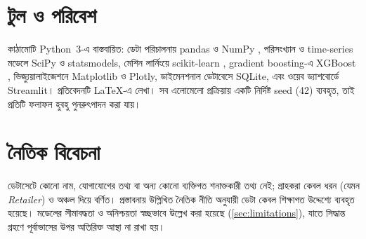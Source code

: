 \section{টুল ও পরিবেশ}
কাঠামোটি Python~3-এ বাস্তবায়িত: ডেটা পরিচালনায় pandas ও NumPy \citep{mckinney2022}, পরিসংখ্যান ও time-series মডেলে SciPy ও
statsmodels, মেশিন লার্নিংয়ে scikit-learn \citep{pedregosa2011}, gradient boosting-এ XGBoost \citep{chen2016}, ভিজ্যুয়ালাইজেশনে
Matplotlib ও Plotly, ডাইমেনশনাল ডেটাবেসে SQLite, এবং ওয়েব ড্যাশবোর্ডে Streamlit। প্রতিবেদনটি \LaTeX-এ লেখা। সব এলোমেলো
প্রক্রিয়ায় একটি নির্দিষ্ট seed (42) ব্যবহৃত, তাই প্রতিটি ফলাফল হুবহু পুনরুৎপাদন করা যায়।

\section{নৈতিক বিবেচনা}
ডেটাসেটে কোনো নাম, যোগাযোগের তথ্য বা অন্য কোনো ব্যক্তিগত শনাক্তকারী তথ্য নেই; গ্রাহকরা কেবল ধরন (যেমন \emph{Retailer}) ও
অঞ্চল দিয়ে বর্ণিত। প্রস্তাবনায় উল্লিখিত নৈতিক নীতি অনুযায়ী ডেটা কেবল শিক্ষাগত উদ্দেশ্যে ব্যবহৃত হয়েছে। মডেলের সীমাবদ্ধতা ও
অনিশ্চয়তা স্বচ্ছভাবে উল্লেখ করা হয়েছে (\cref{sec:limitations}), যাতে সিদ্ধান্ত গ্রহণে পূর্বাভাসের উপর অতিরিক্ত আস্থা না রাখা হয়।
